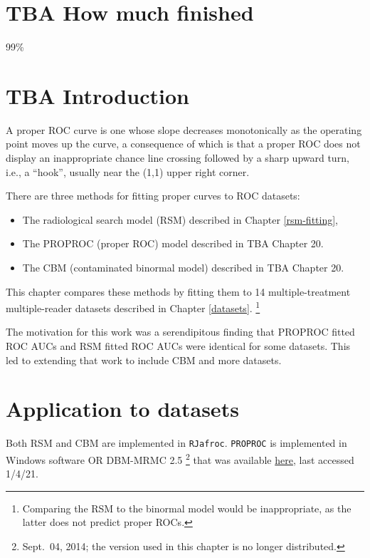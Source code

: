 \documentclass[
]{book}
\providecommand{\tightlist}{%
  \setlength{\itemsep}{0pt}\setlength{\parskip}{0pt}}
\begin{document}
\hypertarget{rsm-3-fits-how-much-finished}{%
\section{TBA How much finished}\label{rsm-3-fits-how-much-finished}}

99\%

\hypertarget{rsm-3-fits-intro}{%
\section{TBA Introduction}\label{rsm-3-fits-intro}}

A proper ROC curve is one whose slope decreases monotonically as the operating point moves up the curve, a consequence of which is that a proper ROC does not display an inappropriate chance line crossing followed by a sharp upward turn, i.e., a ``hook'', usually near the (1,1) upper right corner.

There are three methods for fitting proper curves to ROC datasets:

\begin{itemize}
\tightlist
\item
  The radiological search model (RSM) described in Chapter \ref{rsm-fitting},
\item
  The PROPROC (proper ROC) model described in TBA Chapter 20.
\item
  The CBM (contaminated binormal model) described in TBA Chapter 20.
\end{itemize}

This chapter compares these methods by fitting them to 14 multiple-treatment multiple-reader datasets described in Chapter \ref{datasets}. \footnote{Comparing the RSM to the binormal model would be inappropriate, as the latter does not predict proper ROCs.}

The motivation for this work was a serendipitous finding \citep{chakraborty2011estimating} that PROPROC fitted ROC AUCs and RSM fitted ROC AUCs were identical for some datasets. This led to extending that work to include CBM and more datasets.

\hypertarget{rsm-3-fits-applications}{%
\section{Application to datasets}\label{rsm-3-fits-applications}}

Both RSM and CBM are implemented in \texttt{RJafroc}. \texttt{PROPROC} is implemented in Windows software OR DBM-MRMC 2.5 \footnote{Sept.~04, 2014; the version used in this chapter is no longer distributed.} that was available \href{https://perception.lab.uiowa.edu/software}{here}, last accessed 1/4/21.
\end{document}
